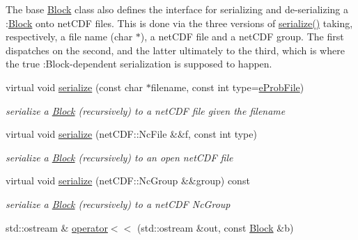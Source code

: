 The base \mbox{\hyperlink{class_s_m_spp__di__unipi__it_1_1_block}{Block}} class also defines the interface for serializing and de-\/serializing a \+:\mbox{\hyperlink{class_s_m_spp__di__unipi__it_1_1_block}{Block}} onto net\+C\+DF files. This is done via the three versions of \mbox{\hyperlink{class_s_m_spp__di__unipi__it_1_1_block_a8209df4072912666c1ea5f6979c035fc}{serialize()}} taking, respectively, a file name (char $\ast$), a net\+C\+DF file and a net\+C\+DF group. The first dispatches on the second, and the latter ultimately to the third, which is where the true \+:Block-\/dependent serialization is supposed to happen. \begin{DoxyCompactItemize}
\item 
virtual void \mbox{\hyperlink{class_s_m_spp__di__unipi__it_1_1_block_a8209df4072912666c1ea5f6979c035fc}{serialize}} (const char $\ast$filename, const int type=\mbox{\hyperlink{group___s_m_s__types_ggab8fe98d4e6a9961e16ab25006d6eebd8ab4763484df9e463c82bde775db014c10}{e\+Prob\+File}})
\begin{DoxyCompactList}\small\item\em serialize a \mbox{\hyperlink{class_s_m_spp__di__unipi__it_1_1_block}{Block}} (recursively) to a net\+C\+DF file given the filename \end{DoxyCompactList}\item 
virtual void \mbox{\hyperlink{class_s_m_spp__di__unipi__it_1_1_block_a7f0d5cf07b22aef912bfa8ac4b45924c}{serialize}} (net\+C\+D\+F\+::\+Nc\+File \&\&f, const int type)
\begin{DoxyCompactList}\small\item\em serialize a \mbox{\hyperlink{class_s_m_spp__di__unipi__it_1_1_block}{Block}} (recursively) to an open net\+C\+DF file \end{DoxyCompactList}\item 
virtual void \mbox{\hyperlink{class_s_m_spp__di__unipi__it_1_1_block_a59f3f59d72c56028f06c555bdcd36caf}{serialize}} (net\+C\+D\+F\+::\+Nc\+Group \&\&group) const
\begin{DoxyCompactList}\small\item\em serialize a \mbox{\hyperlink{class_s_m_spp__di__unipi__it_1_1_block}{Block}} (recursively) to a net\+C\+DF Nc\+Group \end{DoxyCompactList}\item 
std\+::ostream \& \mbox{\hyperlink{class_s_m_spp__di__unipi__it_1_1_block_aaf14d09576853bb38438285dacb32655}{operator$<$$<$}} (std\+::ostream \&out, const \mbox{\hyperlink{class_s_m_spp__di__unipi__it_1_1_block}{Block}} \&b)

\end{DoxyCompactItemize}
